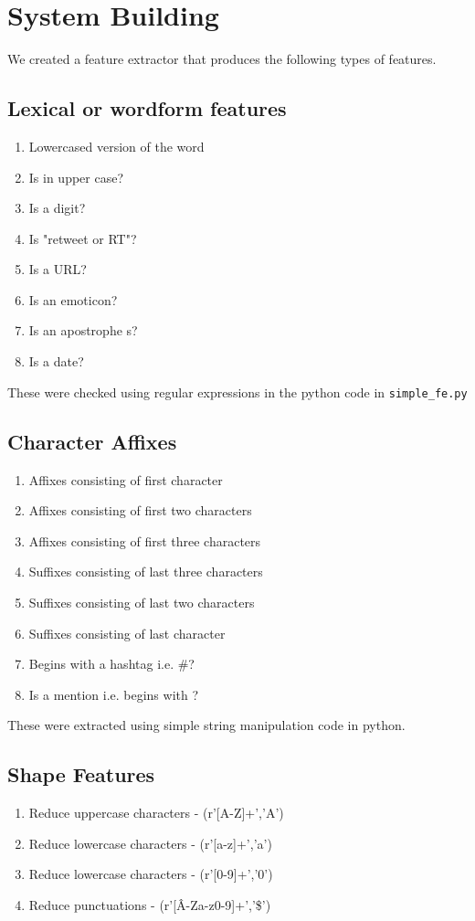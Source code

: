 \documentclass[a4paper]{article}
\begin{document}
\section{System Building}

We created a feature extractor that produces the following types of features. 


\subsection{Lexical or wordform features}
\begin{enumerate}
\item Lowercased version of the word
\item Is in upper case?
\item Is a digit?
\item Is "retweet or RT"?
\item Is a URL?
\item Is an emoticon?
\item Is an apostrophe s?
\item Is a date?
\end{enumerate}

These were checked using regular expressions in the python code in \texttt{simple\_fe.py}

\subsection{Character Affixes}
\begin{enumerate}
\item Affixes consisting of first character
\item Affixes consisting of first two characters
\item Affixes consisting of first three characters
\item Suffixes consisting of last three characters
\item Suffixes consisting of last two characters
\item Suffixes consisting of last character
\item Begins with a hashtag i.e. \#?
\item Is a mention i.e. begins with \@?
\end{enumerate}

These were extracted using simple string manipulation code in python. 

\subsection{Shape Features}
\begin{enumerate}
\item Reduce uppercase characters - (r'[A-Z]+','A')
\item Reduce lowercase characters - (r'[a-z]+','a')
\item Reduce lowercase characters - (r'[0-9]+','0')
\item Reduce punctuations - (r'[\^A-Za-z0-9]+','\$')
\end{enumerate}
\end{document}
